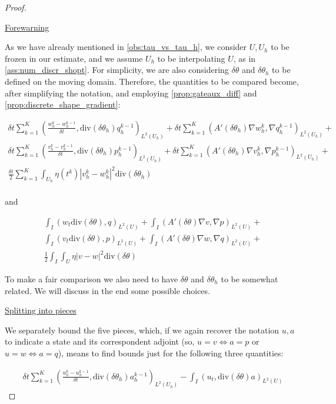 \documentclass[english,a4paper,10pt,oneside]{scrbook}	%
\theoremstyle{break}
\newenvironment{mproof}[1][\proofname]{%
  \begin{proof}[#1]$ $\par\nobreak\ignorespaces
}{%
  \end{proof}
}
\renewcommand*{\proofname}{Proof}
\theoremstyle{remark}
\newcommand{\te}{\theta}
\newcommand{\dive}{\text{div}}
\begin{document}
\begin{mproof}

\underline{Forewarning}

As we have already mentioned in \cref{obs:tau_vs_tau_h}, we consider $U, U_h$ to be frozen in our estimate, and we assume $U_h$ to be interpolating $U$, as in \cref{ass:num_discr_shopt}. For simplicity, we are also considering $\delta \theta$ and $\delta \theta_h$ to be defined on the moving domain. Therefore, the quantities to be compared become, after simplifying the notation, and employing \cref{prop:gateaux_diff} and \cref{prop:discrete_shape_gradient}:

\begin{align*}
	\delta t \sum_{k=1}^{K} \left (\frac{w_h^{k}-w_h^{k-1}}{\delta t}, \dive(\delta \theta_h ) q_h^{k-1} \right )_{L^2(U_h)} + \delta t \sum_{k=1}^{K} (A'(\delta \theta_h ) \nabla w_h^k, \nabla q_h^{k-1})_{L^2(U_h)}+\\
	\delta t \sum_{k=1}^{K} \left (\frac{v_h^{k}-v_h^{k-1}}{\delta t}, \dive(\delta \theta_h ) p_h^{k-1} \right )_{L^2(U_h)} + \delta t \sum_{k=1}^{K} (A'(\delta \theta_h) \nabla v_h^k, \nabla p_h^{k-1})_{L^2(U_h)}+\\
	\frac{\delta t}{2} \sum_{k=1}^{K} \int_{U_h} \eta(t^k)|v_h^k-w_h^k|^2  \dive(\delta \theta_h )\\
\end{align*}

and

\begin{align*}
	\int_I (w_t \dive(\delta \te), q)_{L^2(U)}+ \int_I (A'(\delta\te )\nabla v, \nabla p)_{L^2(U)}+\\
\int_I (v_t\dive(\delta \te), p)_{L^2(U)}+ \int_I (A'(\delta\te )\nabla w, \nabla q)_{L^2(U)}+\\
\frac{1}{2}\int_I\int_{U}\eta |v-w|^2\dive(\delta \te)
\end{align*}

To make a fair comparison we also need to have $\delta \te $ and $\delta \te_h$ to be somewhat related. We will discuss in the end some possible choices.

\underline{Splitting into pieces}

We separately bound the five pieces, which, if we again recover the notation $u, a$ to indicate a state and its correspondent adjoint (so, $u=v \iff a = p$ or $u=w \iff a = q$), means to find bounds just for the following three quantities:

\begin{align*}
	\delta t \sum_{k=1}^{K} \left (\frac{u_h^{k}-u_h^{k-1}}{\delta t}, \dive(\delta \theta_h ) a_h^{k-1} \right )_{L^2(U_h)}  - \int_I (u_t , \dive(\delta \te) a)_{L^2(U)}
\end{align*}


\end{mproof}
\end{document}
